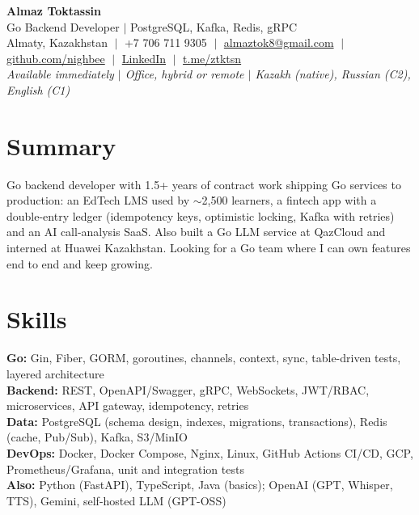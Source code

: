 \documentclass[10pt,a4paper]{article}
\begin{document}
\begin{center}
  {\LARGE \textbf{Almaz Toktassin}}\\[2pt]
  Go Backend Developer $|$ PostgreSQL, Kafka, Redis, gRPC\\[3pt]
  Almaty, Kazakhstan $\;|\;$ +7 706 711 9305 $\;|\;$
  \href{mailto:almaztok8@gmail.com}{almaztok8@gmail.com} $\;|\;$
  \href{https://github.com/nighbee}{github.com/nighbee} $\;|\;$
  \href{https://www.linkedin.com/in/almaz-toktassin-5405922a9/}{LinkedIn} $\;|\;$
  \href{https://t.me/ztktsn}{t.me/ztktsn}\\
  \textit{Available immediately $|$ Office, hybrid or remote $|$ Kazakh (native), Russian (C2), English (C1)}
\end{center}

\section{Summary}
Go backend developer with 1.5+ years of contract work shipping Go services to production: an EdTech LMS used by $\sim$2,500 learners, a fintech app with a double-entry ledger (idempotency keys, optimistic locking, Kafka with retries) and an AI call-analysis SaaS. Also built a Go LLM service at QazCloud and interned at Huawei Kazakhstan. Looking for a Go team where I can own features end to end and keep growing.

\section{Skills}
\textbf{Go:} Gin, Fiber, GORM, goroutines, channels, context, sync, table-driven tests, layered architecture\\
\textbf{Backend:} REST, OpenAPI/Swagger, gRPC, WebSockets, JWT/RBAC, microservices, API gateway, idempotency, retries\\
\textbf{Data:} PostgreSQL (schema design, indexes, migrations, transactions), Redis (cache, Pub/Sub), Kafka, S3/MinIO\\
\textbf{DevOps:} Docker, Docker Compose, Nginx, Linux, GitHub Actions CI/CD, GCP, Prometheus/Grafana, unit and integration tests\\
\textbf{Also:} Python (FastAPI), TypeScript, Java (basics); OpenAI (GPT, Whisper, TTS), Gemini, self-hosted LLM (GPT-OSS)
\end{document}
